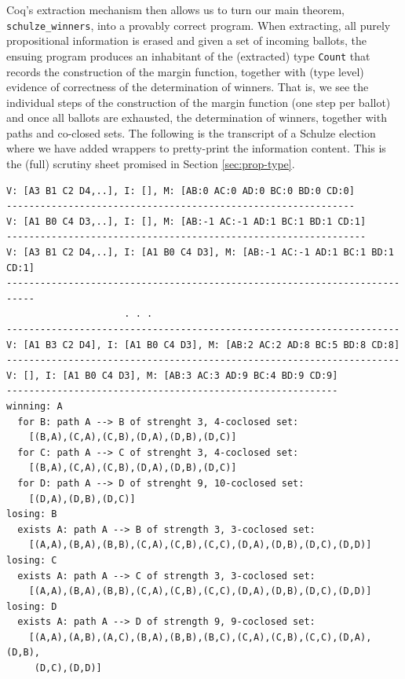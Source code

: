 Coq's extraction mechanism then allows us to turn our main theorem, 
\linebreak
\texttt{schulze\_winners}, into a
provably correct program. When extracting, all purely propositional
information is erased and given a set of incoming ballots, the ensuing program produces an inhabitant
of the (extracted) type \texttt{Count} that records the construction
of the margin function, together with (type level) evidence of
correctness of the determination of winners. That is, we see the
individual steps of the construction of the margin function (one
step per
ballot) and once all ballots are exhausted, the determination of
winners, together with paths and co-closed sets. The following is
the transcript of a Schulze election where we have added wrappers
to pretty-print the information content. This is the (full) scrutiny
sheet promised in Section \ref{sec:prop-type}.
%
\newpage
\begin{footnotesize}
\begin{verbatim}
V: [A3 B1 C2 D4,..], I: [], M: [AB:0 AC:0 AD:0 BC:0 BD:0 CD:0]
--------------------------------------------------------------
V: [A1 B0 C4 D3,..], I: [], M: [AB:-1 AC:-1 AD:1 BC:1 BD:1 CD:1]
----------------------------------------------------------------
V: [A3 B1 C2 D4,..], I: [A1 B0 C4 D3], M: [AB:-1 AC:-1 AD:1 BC:1 BD:1 CD:1]
---------------------------------------------------------------------------
                     . . .
----------------------------------------------------------------------
V: [A1 B3 C2 D4], I: [A1 B0 C4 D3], M: [AB:2 AC:2 AD:8 BC:5 BD:8 CD:8]
----------------------------------------------------------------------
V: [], I: [A1 B0 C4 D3], M: [AB:3 AC:3 AD:9 BC:4 BD:9 CD:9]
-----------------------------------------------------------
winning: A
  for B: path A --> B of strenght 3, 4-coclosed set: 
    [(B,A),(C,A),(C,B),(D,A),(D,B),(D,C)]
  for C: path A --> C of strenght 3, 4-coclosed set:
    [(B,A),(C,A),(C,B),(D,A),(D,B),(D,C)]
  for D: path A --> D of strenght 9, 10-coclosed set:
    [(D,A),(D,B),(D,C)]
losing: B
  exists A: path A --> B of strength 3, 3-coclosed set:
    [(A,A),(B,A),(B,B),(C,A),(C,B),(C,C),(D,A),(D,B),(D,C),(D,D)]
losing: C
  exists A: path A --> C of strength 3, 3-coclosed set:
    [(A,A),(B,A),(B,B),(C,A),(C,B),(C,C),(D,A),(D,B),(D,C),(D,D)]
losing: D
  exists A: path A --> D of strength 9, 9-coclosed set:
    [(A,A),(A,B),(A,C),(B,A),(B,B),(B,C),(C,A),(C,B),(C,C),(D,A),(D,B),
     (D,C),(D,D)]  
\end{verbatim}
\end{footnotesize}

